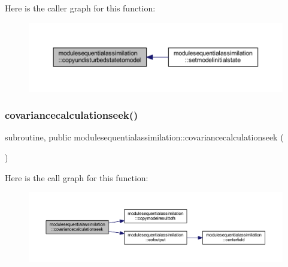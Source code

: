 Here is the caller graph for this function\+:\nopagebreak
\begin{figure}[H]
\begin{center}
\leavevmode
\includegraphics[width=350pt]{namespacemodulesequentialassimilation_ad07159048364faf26c59ebffd5b246a3_icgraph}
\end{center}
\end{figure}
\mbox{\label{namespacemodulesequentialassimilation_a89d62f9ba6c7cad76cf6a6dd37165fab}} 
\subsubsection{\texorpdfstring{covariancecalculationseek()}{covariancecalculationseek()}}
{\footnotesize\ttfamily subroutine, public modulesequentialassimilation\+::covariancecalculationseek (\begin{DoxyParamCaption}{ }\end{DoxyParamCaption})}

Here is the call graph for this function\+:\nopagebreak
\begin{figure}[H]
\begin{center}
\leavevmode
\includegraphics[width=350pt]{namespacemodulesequentialassimilation_a89d62f9ba6c7cad76cf6a6dd37165fab_cgraph}
\end{center}
\end{figure}
\mbox{\label{namespacemodulesequentialassimilation_a3d80f83cfeb707312981be037f194082}} 
